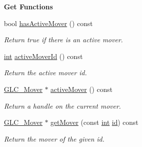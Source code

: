 \begin{Indent}{\bf Get Functions}\par
\begin{DoxyCompactItemize}
\item 
bool \hyperlink{class_g_l_c___mover_controller_a0931866b4d2e466d130a5c293bb9e67a}{has\-Active\-Mover} () const 
\begin{DoxyCompactList}\small\item\em Return true if there is an active mover. \end{DoxyCompactList}\item 
\hyperlink{ioapi_8h_a787fa3cf048117ba7123753c1e74fcd6}{int} \hyperlink{class_g_l_c___mover_controller_af5f2c1274ada31e911e8b359379bf27f}{active\-Mover\-Id} () const 
\begin{DoxyCompactList}\small\item\em Return the active mover id. \end{DoxyCompactList}\item 
\hyperlink{class_g_l_c___mover}{G\-L\-C\-\_\-\-Mover} $\ast$ \hyperlink{class_g_l_c___mover_controller_a41ed23a92f321302bd55ae95b2cac113}{active\-Mover} () const 
\begin{DoxyCompactList}\small\item\em Return a handle on the current mover. \end{DoxyCompactList}\item 
\hyperlink{class_g_l_c___mover}{G\-L\-C\-\_\-\-Mover} $\ast$ \hyperlink{class_g_l_c___mover_controller_abe6321902667316d5d26740450350acc}{get\-Mover} (const \hyperlink{ioapi_8h_a787fa3cf048117ba7123753c1e74fcd6}{int} \hyperlink{glext_8h_a58c2a664503e14ffb8f21012aabff3e9}{id}) const 
\begin{DoxyCompactList}\small\item\em Return the mover of the given id. \end{DoxyCompactList}\end{DoxyCompactItemize}
\end{Indent}
